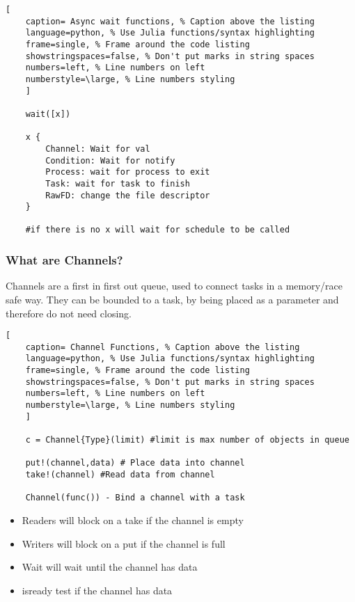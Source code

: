 \documentclass[11pt]{scrartcl} %
\begin{document}
\begin{lstlisting}[
	caption= Async wait functions, % Caption above the listing
	language=python, % Use Julia functions/syntax highlighting
	frame=single, % Frame around the code listing
	showstringspaces=false, % Don't put marks in string spaces
	numbers=left, % Line numbers on left
	numberstyle=\large, % Line numbers styling
	]

	wait([x])

	x {
		Channel: Wait for val
		Condition: Wait for notify 
		Process: wait for process to exit
		Task: wait for task to finish
		RawFD: change the file descriptor
	}

	#if there is no x will wait for schedule to be called

\end{lstlisting}

\subsubsection{What are Channels?}

Channels are a first in first out queue, used to connect tasks in a memory/race safe way. They can be
bounded to a task, by being placed as a parameter and therefore do not need closing.

\begin{lstlisting}[
	caption= Channel Functions, % Caption above the listing
	language=python, % Use Julia functions/syntax highlighting
	frame=single, % Frame around the code listing
	showstringspaces=false, % Don't put marks in string spaces
	numbers=left, % Line numbers on left
	numberstyle=\large, % Line numbers styling
	]

	c = Channel{Type}(limit) #limit is max number of objects in queue

	put!(channel,data) # Place data into channel
	take!(channel) #Read data from channel

	Channel(func()) - Bind a channel with a task

\end{lstlisting}

\begin{itemize}
	\item Readers will block on a take if the channel is empty
	\item Writers will block on a put if the channel is full
	\item Wait will wait until the channel has data
	\item isready test if the channel has data
\end{itemize}
\end{document}

